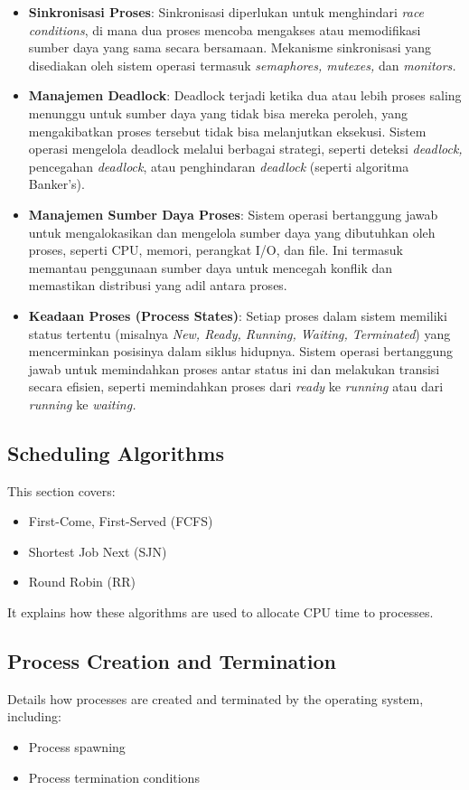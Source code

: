 \documentclass[12pt]{article}
\begin{document}
\begin{itemize}
    \item \textbf{Sinkronisasi Proses}: 
    Sinkronisasi diperlukan untuk menghindari \textit{race conditions}, di mana dua proses mencoba mengakses atau memodifikasi sumber daya yang sama secara bersamaan. Mekanisme sinkronisasi yang disediakan oleh sistem operasi termasuk\textit{ semaphores, mutexes,} dan \textit{monitors.}
    
    \item \textbf{Manajemen Deadlock}: 
    Deadlock terjadi ketika dua atau lebih proses saling menunggu untuk sumber daya yang tidak bisa mereka peroleh, yang mengakibatkan proses tersebut tidak bisa melanjutkan eksekusi. Sistem operasi mengelola deadlock melalui berbagai strategi, seperti deteksi \textit{deadlock, }pencegahan \textit{deadlock}, atau penghindaran \textit{deadlock} (seperti algoritma Banker's).
    
    \item \textbf{Manajemen Sumber Daya Proses}: 
    Sistem operasi bertanggung jawab untuk mengalokasikan dan mengelola sumber daya yang dibutuhkan oleh proses, seperti CPU, memori, perangkat I/O, dan file. Ini termasuk memantau penggunaan sumber daya untuk mencegah konflik dan memastikan distribusi yang adil antara proses.
    
    \item \textbf{Keadaan Proses (Process States)}: 
    Setiap proses dalam sistem memiliki status tertentu (misalnya \textit{New, Ready, Running, Waiting, Terminated}) yang mencerminkan posisinya dalam siklus hidupnya. Sistem operasi bertanggung jawab untuk memindahkan proses antar status ini dan melakukan transisi secara efisien, seperti memindahkan proses dari \textit{ready} ke \textit{running} atau dari \textit{running} ke \textit{waiting.}
\end{itemize}

\subsection{Scheduling Algorithms}
This section covers:
\begin{itemize}
    \item First-Come, First-Served (FCFS)
    \item Shortest Job Next (SJN)
    \item Round Robin (RR)
\end{itemize}
It explains how these algorithms are used to allocate CPU time to processes.

\subsection{Process Creation and Termination}
Details how processes are created and terminated by the operating system, including:
\begin{itemize}
    \item Process spawning
    \item Process termination conditions
\end{itemize}
\end{document}
